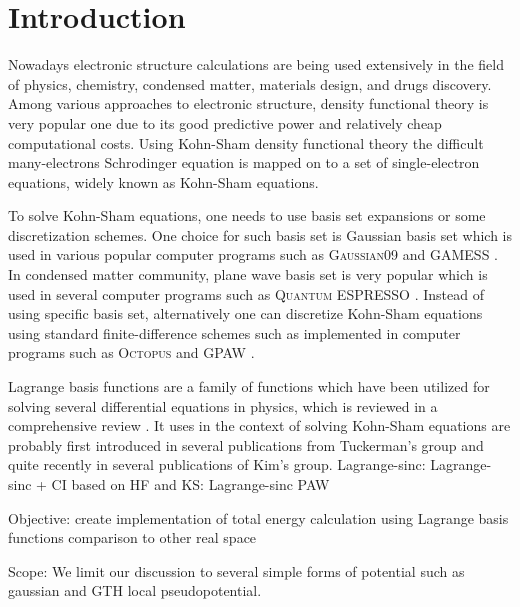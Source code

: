 \section{Introduction}

Nowadays electronic structure calculations are being used extensively in the field of
physics, chemistry, condensed matter, materials design, and drugs discovery.
Among various approaches to electronic structure, density functional theory
\cite{Hohenberg1964} is very popular one due to its good predictive
power and relatively cheap computational costs.
Using Kohn-Sham density functional theory \cite{Kohn1965} the difficult many-electrons
Schrodinger equation is mapped on to a set of single-electron equations, widely known
as Kohn-Sham equations.

To solve Kohn-Sham equations, one needs to use basis set expansions or some discretization
schemes. One choice for such basis set is Gaussian basis set which
is used in various popular computer programs such as
\textsc{Gaussian09} \cite{Gaussian2009} and GAMESS \cite{Schmidt1993,Gordon2005}.
In condensed matter community, plane wave basis set is very popular
which is used in several computer programs such as
\textsc{Quantum ESPRESSO} \cite{Giannozzi2009,Giannozzi2017}.
Instead of using specific basis set, alternatively one can discretize Kohn-Sham equations
using standard finite-difference schemes such as implemented in computer programs
such as \textsc{Octopus} \cite{Marques2003,Castro2006,Xavier2015}
and \textsc{GPAW} \cite{Enkovaara2010}.

Lagrange basis functions are a family of functions which have been
utilized for solving several differential equations in physics, which
is reviewed in a comprehensive review \cite{Baye2015}.
It uses in the context of solving Kohn-Sham equations are probably
first introduced in several publications from Tuckerman's group
\cite{HeeSeungLee2006,HeeSeungLee2006,HeeSeungLee2008}
and quite recently in several publications of Kim's group.
Lagrange-sinc: \cite{Choi2015,Choi2016}
Lagrange-sinc + CI based on HF and KS: \cite{Kim2015}
Lagrange-sinc PAW \cite{Kang2016}



Objective:
create implementation of total energy calculation using Lagrange basis functions
comparison to other real space

Scope: We limit our discussion to several simple forms of potential such as
gaussian and GTH local pseudopotential.

